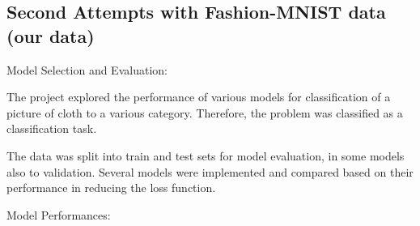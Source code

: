\documentclass{article}
\begin{document}
\subsection{Second Attempts with Fashion-MNIST data (our data)}
Model Selection and Evaluation:

The project explored the performance of various models for classification of a picture of cloth to a various category. Therefore, the problem was classified as a classification task.

The data was split into train and test sets for model evaluation, in some models also to validation. Several models were implemented and compared based on their performance in reducing the loss function.

Model Performances:





\end{document}
